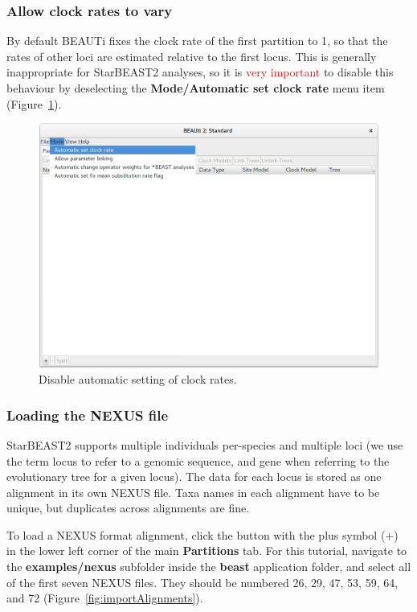 \documentclass{article}
\begin{document}
\clearpage

\subsubsection*{Allow clock rates to vary}

By default BEAUTi fixes the clock rate of the first partition to 1, so that
the rates of other loci are estimated relative to the first locus. This is
generally inappropriate for StarBEAST2 analyses, so it is \textcolor{red}{very
important} to disable this behaviour by deselecting the \textbf{Mode/Automatic
set clock rate} menu item (Figure~\ref{fig:disableAuto}).

\begin{figure}[htb!]
\centering
\includegraphics[width=\textwidth]{figures/beauti-disable.png}
\caption{Disable automatic setting of clock rates.}
\label{fig:disableAuto}
\end{figure}

\clearpage

\subsubsection*{Loading the NEXUS file}

StarBEAST2 supports multiple individuals per-species and multiple loci (we use
the term locus to refer to a genomic sequence, and gene when referring to the
evolutionary tree for a given locus). The data for each locus is stored as one
alignment in its own NEXUS file. Taxa names in each alignment have to be unique,
but duplicates across alignments are fine.

To load a NEXUS format alignment, click the button with the plus symbol ($+$) in
the lower left corner of the main \textbf{Partitions} tab. For this tutorial,
navigate to the \textbf{examples/nexus} subfolder inside the \textbf{beast}
application folder, and select all of the first seven NEXUS files. They should
be numbered 26, 29, 47, 53, 59, 64, and 72 (Figure~\ref{fig:importAlignments}).
\end{document}
